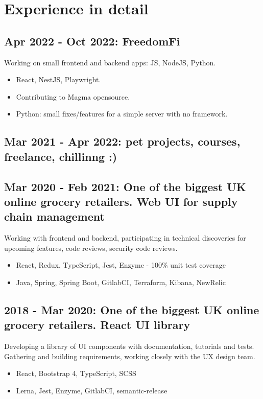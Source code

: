 \documentclass[a4paper, 14pt]{article}
\begin{document}
\section{Experience in detail}
  \subsection{Apr 2022 - Oct 2022: FreedomFi}
    Working on small frontend and backend apps: JS, NodeJS, Python.
    \begin{itemize}
      \item React, NestJS, Playwright. \\
      \item Contributing to Magma opensource. \\
      \item Python: small fixes/features for a simple server with no framework.
    \end{itemize}
  \subsection{Mar 2021 - Apr 2022: pet projects, courses, freelance, chillinng :)}
  \subsection{Mar 2020 - Feb 2021: One of the biggest UK online grocery retailers. Web UI for supply chain management}
  Working with frontend and backend, participating in technical discoveries for upcoming features, code reviews, security code reviews.
    \begin{itemize}
      \item React, Redux, TypeScript, Jest, Enzyme - 100\% unit test coverage \\
      \item Java, Spring, Spring Boot, GitlabCI, Terraform, Kibana, NewRelic
    \end{itemize}
  \subsection{2018 - Mar 2020: One of the biggest UK online grocery retailers. React UI library}
    Developing a library of UI components with documentation, tutorials and tests. \\
    Gathering and building requirements, working closely with the UX design team.
    \begin{itemize}
      \item React, Bootstrap 4, TypeScript, SCSS \\ 
      \item Lerna, Jest, Enzyme, GitlabCI, semantic-release
    \end{itemize}
\end{document}
